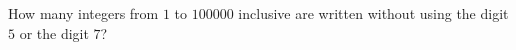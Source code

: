 How many integers from $1$ to $100000$ inclusive are written without using the digit $5$ or the digit $7$?
